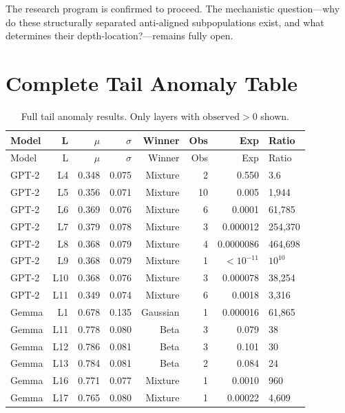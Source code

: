 \documentclass[11pt,a4paper]{article}
\begin{document}
The research program is confirmed to proceed. The mechanistic question---why do these structurally separated anti-aligned subpopulations exist, and what determines their depth-location?---remains fully open.

\newpage
\appendix

\section{Complete Tail Anomaly Table}
\label{app:full_table}

\begin{longtable}{@{}lrrrrrrl@{}}
\caption{Full tail anomaly results. Only layers with $\text{observed} > 0$ shown.}\label{tab:full_tail}\\
\toprule
Model & L & $\mu$ & $\sigma$ & Winner & Obs & Exp & Ratio \\
\midrule
\endfirsthead
\toprule
Model & L & $\mu$ & $\sigma$ & Winner & Obs & Exp & Ratio \\
\midrule
\endhead
\bottomrule
\endfoot
GPT-2 & L4  & 0.348 & 0.075 & Mixture & 2  & 0.550    & 3.6 \\
GPT-2 & L5  & 0.356 & 0.071 & Mixture & 10 & 0.005    & 1,944 \\
GPT-2 & L6  & 0.369 & 0.076 & Mixture & 6  & 0.0001   & 61,785 \\
GPT-2 & L7  & 0.379 & 0.078 & Mixture & 3  & 0.000012 & 254,370 \\
GPT-2 & L8  & 0.368 & 0.079 & Mixture & 4  & 0.0000086 & 464,698 \\
GPT-2 & L9  & 0.368 & 0.079 & Mixture & 1  & $<10^{-11}$ & $10^{10}$ \\
GPT-2 & L10 & 0.368 & 0.076 & Mixture & 3  & 0.000078 & 38,254 \\
GPT-2 & L11 & 0.349 & 0.074 & Mixture & 6  & 0.0018   & 3,316 \\
Gemma & L1  & 0.678 & 0.135 & Gaussian & 1 & 0.000016 & 61,865 \\
Gemma & L11 & 0.778 & 0.080 & Beta    & 3 & 0.079    & 38 \\
Gemma & L12 & 0.786 & 0.081 & Beta    & 3 & 0.101    & 30 \\
Gemma & L13 & 0.784 & 0.081 & Beta    & 2 & 0.084    & 24 \\
Gemma & L16 & 0.771 & 0.077 & Mixture & 1 & 0.0010   & 960 \\
Gemma & L17 & 0.765 & 0.080 & Mixture & 1 & 0.00022  & 4,609 \\

\end{longtable}
\end{document}
